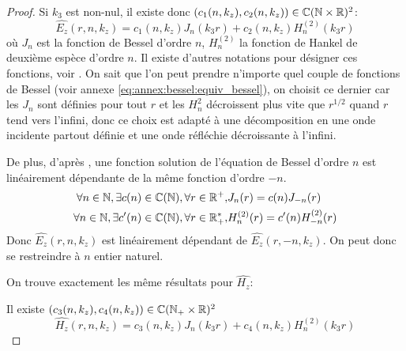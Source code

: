 \begin{proof}
    Si \(k_3\) est non-nul, il existe donc \((c_1(n,k_z),c_2(n,k_z)) \in \mathbb C(\mathbb N\times\mathbb R)^2\):
    \begin{equation*}
          \hat{E_z}(r,n,k_z) = c_1(n,k_z) J_n\left(k_3r\right) + c_2(n,k_z) H_n^{(2)}\left(k_3r\right)
    \end{equation*}
    où \(J_n\) est la fonction de Bessel d'ordre \(n\), \(H_n^{(2)}\) la fonction de Hankel de deuxième espèce d'ordre \(n\). Il existe d'autres notations pour désigner ces fonctions,  voir \cite[p.~358]{abramowitz_handbook_1964}.
    On sait que l'on peut prendre n'importe quel couple de fonctions de Bessel (voir annexe \eqref{eq:annex:bessel:equiv_bessel}), on choisit ce dernier car les \(J_n\) sont définies pour tout \(r\) et les \(H_n^{2}\) décroissent plus vite que \(r^{1 \slash 2}\) quand \(r\) tend vers l'infini, donc ce choix est adapté à une décomposition en une onde incidente partout définie et une onde réfléchie décroissante à l'infini.

    De plus, d'après \cite[p.~358]{abramowitz_handbook_1964}, une fonction solution de l'équation de Bessel d'ordre \(n\) est linéairement dépendante de la même fonction d'ordre \(-n\).
    \begin{align*}
       \forall n \in \mathbb N, \exists c(n) \in \mathbb C(\mathbb N), \forall r \in \mathbb R^+,& J_n(r) = c(n)J_{-n}(r)
       \\
       \forall n \in \mathbb N, \exists c'(n) \in \mathbb C(\mathbb N), \forall r \in \mathbb R_+^*,& H_n^{(2)}(r) = c'(n)H_{-n}^{(2)}(r)
    \end{align*}
    Donc  \(\hat{E_z}(r,n,k_z)\) est linéairement dépendant de  \(\hat{E_z}(r,-n,k_z)\).
    On peut donc se restreindre à \(n\) entier naturel.

    On trouve exactement les même résultats pour \(\hat{H_z}\): 

    Il existe \((c_3(n,k_z),c_4(n,k_z)) \in \mathbb C(\mathbb N_+\times\mathbb R)^2\)
    \begin{equation*}
      \hat{H_z}(r,n,k_z) = c_3(n,k_z) J_n\left(k_3r\right) + c_4(n,k_z) H_n^{(2)}\left(k_3r\right)
    \end{equation*}

  \end{proof}

